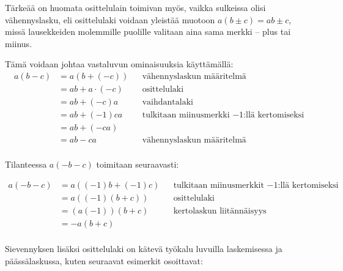 Tärkeää on huomata osittelulain toimivan myös, vaikka sulkeissa olisi vähennyslasku, eli osittelulaki voidaan yleistää muotoon $a(b\pm c)=ab \pm c$, missä lausekkeiden molemmille puolille valitaan aina sama merkki -- plus tai miinus.

Tämä voidaan johtaa vastaluvun ominaisuuksia käyttämällä:
\begin{align*}
	a(b-c)
	&=a(b+(-c)) && \text{vähennyslaskun määritelmä} \\
	&=ab+a\cdot (-c) && \text{osittelulaki} \\
	&=ab+ (-c)a && \text{vaihdantalaki} \\
	&=ab+ (-1)ca && \text{tulkitaan miinusmerkki $-1$:llä kertomiseksi} \\
	&=ab+ (-ca)&& \text{} \\
	&=ab-ca && \text{vähennyslaskun määritelmä} \\
	\end{align*}	
	
Tilanteessa $a(-b-c)$ toimitaan seuraavasti:

\begin{align*}
	a(-b-c)
	&=a((-1)b+(-1)c) && \text{tulkitaan miinusmerkkit $-1$:llä kertomiseksi} \\
	&=a((-1)(b+c)) && \text{osittelulaki} \\
	&=(a(-1))(b+c) && \text{kertolaskun liitännäisyys} \\
	&=-a(b+c) && \text{} \\
	\end{align*}	

Sievennyksen lisäksi osittelulaki on kätevä työkalu luvuilla laskemisessa ja päässälaskussa, kuten seuraavat esimerkit osoittavat:

\begin{esimerkki}
\end{esimerkki}

